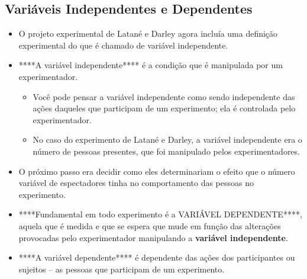 \documentclass[
]{book}
\providecommand{\tightlist}{%
  \setlength{\itemsep}{0pt}\setlength{\parskip}{0pt}}
\begin{document}
\hypertarget{variuxe1veis-independentes-e-dependentes}{%
\subsection{Variáveis Independentes e Dependentes}\label{variuxe1veis-independentes-e-dependentes}}

\begin{itemize}
\tightlist
\item
  O projeto experimental de Latané e Darley agora incluía uma definição experimental do que é chamado de variável independente.
\item
  ****A variável independente**** é a condição que é manipulada por um experimentador.

  \begin{itemize}
  \tightlist
  \item
    Você pode pensar a variável independente como sendo independente das ações daqueles que participam de um experimento; ela é controlada pelo experimentador.
  \item
    No caso do experimento de Latané e Darley, a variável independente era o número de pessoas presentes, que foi manipulado pelos experimentadores.
  \end{itemize}
\item
  O próximo passo era decidir como eles determinariam o efeito que o número variável de espectadores tinha no comportamento das pessoas no experimento.
\item
  ****Fundamental em todo experimento é a VARIÁVEL DEPENDENTE****, aquela que é medida e que se espera que mude em função das alterações provocadas pelo experimentador manipulando a \textbf{variável independente}.
\item
  ****A variável dependente**** é dependente das ações dos participantes ou sujeitos -- as pessoas que participam de um experimento.


\end{itemize}
\end{document}
